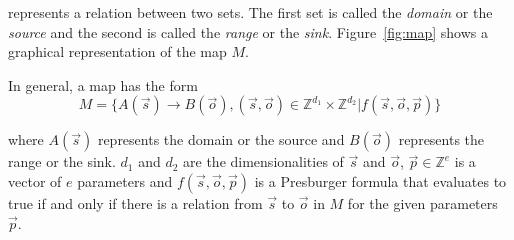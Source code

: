 \noindent represents a relation between two sets. The first set
is called the \emph{domain} or the \emph{source}
and the second is called the \emph{range} or the
\emph{sink}.
Figure~\ref{fig:map} shows a graphical representation of
the map $M$.


In general, a map has the form
$$M = \{A(\vec{s}) \rightarrow B(\vec{o}), (\vec{s}, \vec{o}) \in \mathbb{Z}^{d_1}\times\mathbb{Z}^{d_2} | f(\vec{s}, \vec{o}, \vec{p})\}$$

\noindent where $A(\vec{s})$ represents the domain or the
source and $B(\vec{o})$ represents the range or the sink.
$d_1$ and $d_2$ are the dimensionalities of $\vec{s}$
and $\vec{o}$, $\vec{p} \in \mathbb{Z}^e$ is a vector of $e$ parameters and $f(\vec{s}, \vec{o}, \vec{p})$ is a Presburger formula that evaluates to true if and only if there is a relation from $\vec{s}$ to $\vec{o}$ in $M$ for the given parameters
$\vec{p}$.








